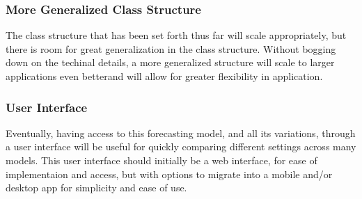 \documentclass[12pt,letterpaper,titlepage]{article}
\begin{document}
		\subsubsection*{More Generalized Class Structure}
		The class structure that has been set forth thus far will scale appropriately, but there is room for great generalization in the class structure. Without bogging down on the techinal details, a more generalized structure will scale to larger applications even betterand will allow for greater flexibility in application.
		
		\subsubsection*{User Interface}
		Eventually, having access to this forecasting model, and all its variations, through a user interface will be useful for quickly comparing different settings across many models. This user interface should initially be a web interface, for ease of implementaion and access, but with options to migrate into a mobile and/or desktop app for simplicity and ease of use.
\end{document}
